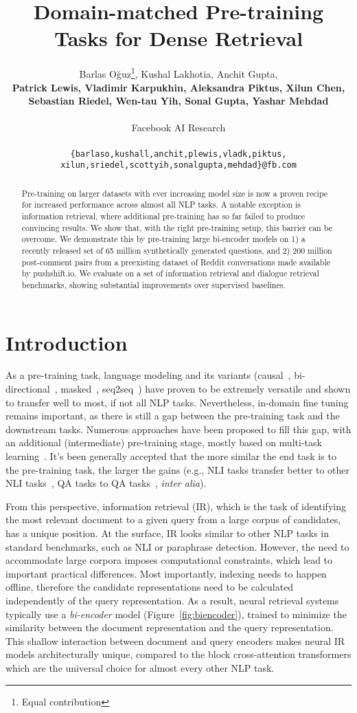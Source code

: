 \documentclass[11pt]{article}
\title{Domain-matched Pre-training Tasks for Dense Retrieval}
\author{
Barlas Oğuz\thanks{\hspace{.06in}Equal contribution}, Kushal Lakhotia\samethanks, Anchit Gupta\samethanks,  \\
\textbf{Patrick Lewis, Vladimir Karpukhin, Aleksandra Piktus, Xilun Chen,} \\
\textbf{Sebastian Riedel, Wen-tau Yih, Sonal Gupta, Yashar Mehdad} \\
\\
Facebook AI Research \\
\\
{\tt \{barlaso,kushall,anchit,plewis,vladk,piktus,} \\
{\tt xilun,sriedel,scottyih,sonalgupta,mehdad\}@fb.com} \\
}
\date{}
\begin{document}
\maketitle
\begin{abstract}
Pre-training on larger datasets with ever increasing model size is
now a proven recipe for increased performance across almost all NLP tasks.
A notable exception is information retrieval, where additional pre-training
has so far failed to produce convincing results.  We show that, with the
right pre-training setup, this barrier can be overcome.  We demonstrate this
by pre-training large bi-encoder models on 1) a recently released set of 65 million
synthetically generated questions, and 2) 200 million post-comment pairs from a preexisting dataset of Reddit conversations made available by pushshift.io.
We evaluate on a set of information retrieval and dialogue retrieval benchmarks, 
showing substantial improvements over supervised baselines.
 \end{abstract}


\section{Introduction}
As a pre-training task, language modeling and its variants (causal~\citep{radford2018improving}, bi-directional~\citep{peters2018deep, baevski2019cloze}, masked~\citep{devlin2018bert}, seq2seq~\citep{bart, t5}) have proven to be extremely versatile and shown to transfer well to most, if not all NLP tasks.  Nevertheless, in-domain fine tuning remains important, as there is still a gap between the pre-training task and the downstream tasks.  Numerous approaches have been proposed to fill this gap, with an additional (intermediate) pre-training stage, mostly based on multi-task learning~\citep{t5, aghajanyan2021muppet}.  It's been generally accepted that the more similar the end task is to the pre-training task, the larger the gains (e.g., NLI tasks transfer better to other NLI tasks~\citep{phang2018sentence}, QA tasks to QA tasks~\citep{khashabi2020unifiedqa}, \textit{inter alia}).

From this perspective, information retrieval (IR), which is the task of identifying the most relevant document to a given query from a large corpus of candidates, has a unique position.  At the surface, IR looks similar to other NLP tasks in standard benchmarks, such as NLI or paraphrase detection.  However, the need to accommodate large corpora imposes computational constraints, which lead to important practical differences.  Most importantly, indexing needs to happen offline, therefore the candidate representations need to be calculated independently of the query representation.  As a result, neural retrieval systems typically use a \textit{bi-encoder} model (Figure~\ref{fig:biencoder}), trained to minimize the similarity between the document representation and the query representation.  This shallow interaction between document and query encoders makes neural IR models architecturally unique, compared to the block cross-attention transformers which are the universal choice for almost every other NLP task.
\end{document}
